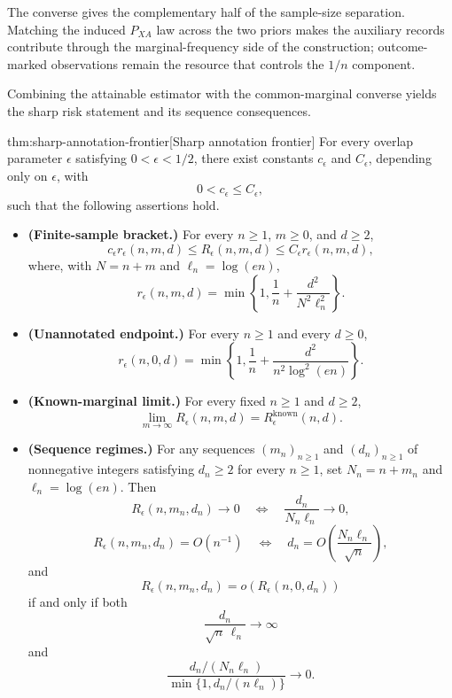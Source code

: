 The converse gives the complementary half of the sample-size separation. Matching the induced \(P_{XA}\) law across the two priors makes the auxiliary records contribute through the marginal-frequency side of the construction; outcome-marked observations remain the resource that controls the \(1/n\) component.

Combining the attainable estimator with the common-marginal converse yields the sharp risk statement and its sequence consequences.

\begin{theoremv}{thm:sharp-annotation-frontier}[Sharp annotation frontier]
For every overlap parameter \(\epsilon\) satisfying \(0<\epsilon<1/2\), there exist constants \(c_\epsilon\) and \(C_\epsilon\), depending only on \(\epsilon\), with
\[
0<c_\epsilon\le C_\epsilon,
\]
such that the following assertions hold.

\begin{itemize}
\item \textbf{(Finite-sample bracket.)} For every \(n\ge1\), \(m\ge0\), and \(d\ge2\),
\[
c_\epsilon r_\epsilon(n,m,d)
\le R_\epsilon(n,m,d)
\le C_\epsilon r_\epsilon(n,m,d),
\]
where, with \(N=n+m\) and \(\ell_n=\log(en)\),
\[
r_\epsilon(n,m,d)
=
\min\!\left\{1,\frac1n+\frac{d^2}{N^2\ell_n^2}\right\}.
\]

\item \textbf{(Unannotated endpoint.)} For every \(n\ge1\) and every \(d\ge0\),
\[
r_\epsilon(n,0,d)
=
\min\!\left\{1,\frac1n+\frac{d^2}{n^2\log^2(en)}\right\}.
\]

\item \textbf{(Known-marginal limit.)} For every fixed \(n\ge1\) and \(d\ge2\),
\[
\lim_{m\to\infty} R_\epsilon(n,m,d)
=
R_\epsilon^{\mathrm{known}}(n,d).
\]

\item \textbf{(Sequence regimes.)} For any sequences \((m_n)_{n\ge1}\) and \((d_n)_{n\ge1}\) of nonnegative integers satisfying \(d_n\ge2\) for every \(n\ge1\), set \(N_n=n+m_n\) and \(\ell_n=\log(en)\). Then
\[
R_\epsilon(n,m_n,d_n)\to0
\quad\Longleftrightarrow\quad
\frac{d_n}{N_n\ell_n}\to0,
\]
\[
R_\epsilon(n,m_n,d_n)=O(n^{-1})
\quad\Longleftrightarrow\quad
d_n=O\!\left(\frac{N_n\ell_n}{\sqrt n}\right),
\]
and
\[
R_\epsilon(n,m_n,d_n)
=
o\!\left(R_\epsilon(n,0,d_n)\right)
\]
if and only if both
\[
\frac{d_n}{\sqrt n\,\ell_n}\to\infty
\]
and
\[
\frac{d_n/(N_n\ell_n)}
{\min\{1,d_n/(n\ell_n)\}}
\to0.
\]
\end{itemize}
\end{theoremv}


